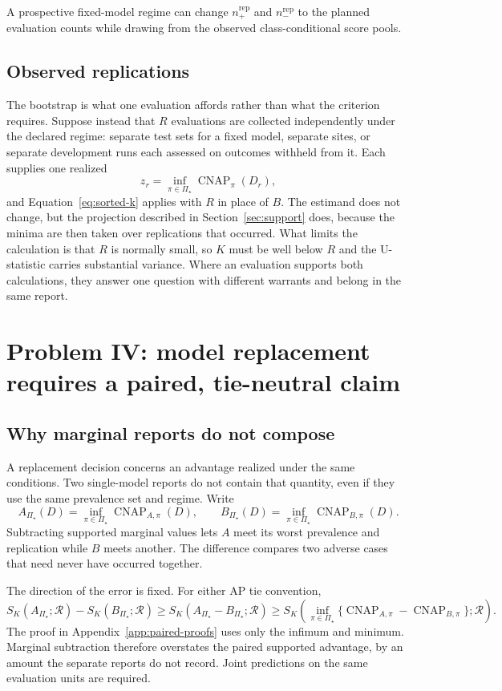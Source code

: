 \documentclass[11pt]{article}
\newcommand{\CNAP}{\operatorname{CNAP}}
\newcommand{\Regime}{\mathcal{R}}
\newcommand{\PSet}{\Pi_\star}
\theoremstyle{remark}
\begin{document}
A prospective fixed-model regime can change $n_+^{\mathrm{rep}}$ and $n_-^{\mathrm{rep}}$ to the planned evaluation counts while drawing from the observed class-conditional score pools.

\subsection{Observed replications}

The bootstrap is what one evaluation affords rather than what the criterion requires. Suppose instead that $R$ evaluations are collected independently under the declared regime: separate test sets for a fixed model, separate sites, or separate development runs each assessed on outcomes withheld from it. Each supplies one realized
\[
z_r
=
\inf_{\pi\in\PSet}\CNAP_\pi(D_r),
\]
and Equation~\eqref{eq:sorted-k} applies with $R$ in place of $B$. The estimand does not change, but the projection described in Section~\ref{sec:support} does, because the minima are then taken over replications that occurred. What limits the calculation is that $R$ is normally small, so $K$ must be well below $R$ and the U-statistic carries substantial variance. Where an evaluation supports both calculations, they answer one question with different warrants and belong in the same report.

\section{Problem IV: model replacement requires a paired, tie-neutral claim}
\label{sec:paired}

\subsection{Why marginal reports do not compose}

A replacement decision concerns an advantage realized under the same conditions. Two single-model reports do not contain that quantity, even if they use the same prevalence set and regime. Write
\[
A_{\PSet}(D)
=
\inf_{\pi\in\PSet}\CNAP_{A,\pi}(D),
\qquad
B_{\PSet}(D)
=
\inf_{\pi\in\PSet}\CNAP_{B,\pi}(D).
\]
Subtracting supported marginal values lets $A$ meet its worst prevalence and replication while $B$ meets another. The difference compares two adverse cases that need never have occurred together.

The direction of the error is fixed. For either AP tie convention,
\begin{equation}
S_K(A_{\PSet};\Regime)
-
S_K(B_{\PSet};\Regime)
\geq
S_K(A_{\PSet}-B_{\PSet};\Regime)
\geq
S_K\left(
\inf_{\pi\in\PSet}
\{\CNAP_{A,\pi}-\CNAP_{B,\pi}\};
\Regime
\right).
\label{eq:noncomposition}
\end{equation}
The proof in Appendix~\ref{app:paired-proofs} uses only the infimum and minimum. Marginal subtraction therefore overstates the paired supported advantage, by an amount the separate reports do not record. Joint predictions on the same evaluation units are required.
\end{document}

